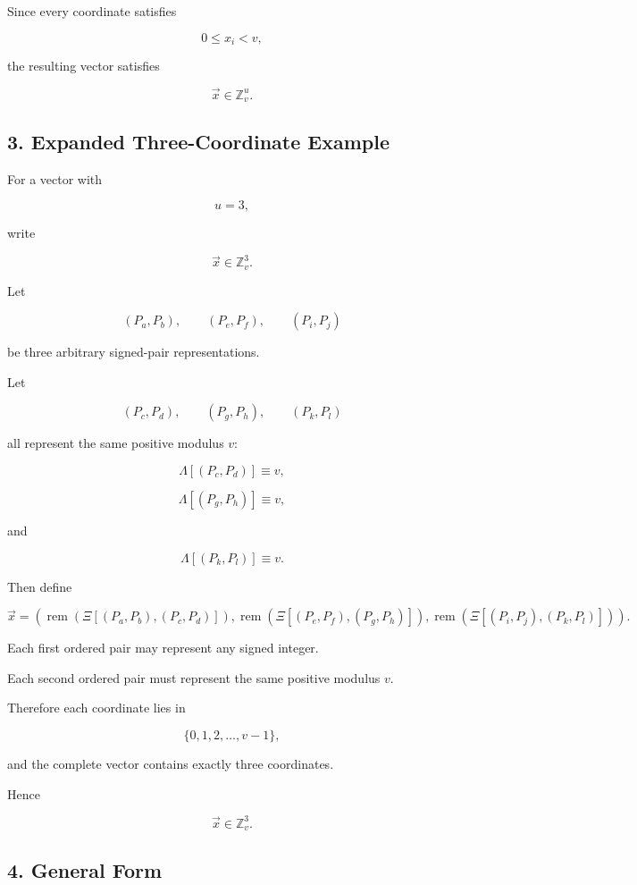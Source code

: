 \documentclass[12pt]{article}
\begin{document}
Since every coordinate satisfies

\[
0\leq x_i<v,
\]

the resulting vector satisfies

\[
\boxed{
\vec{x}\in\mathbb Z_v^u.
}
\]

\subsection*{3. Expanded Three-Coordinate Example}

For a vector with

\[
u=3,
\]

write

\[
\vec{x}\in\mathbb Z_v^3.
\]

Let

\[
(P_a,P_b),
\qquad
(P_e,P_f),
\qquad
(P_i,P_j)
\]

be three arbitrary signed-pair representations.

Let

\[
(P_c,P_d),
\qquad
(P_g,P_h),
\qquad
(P_k,P_l)
\]

all represent the same positive modulus \(v\):

\[
\Lambda[(P_c,P_d)]\equiv v,
\]

\[
\Lambda[(P_g,P_h)]\equiv v,
\]

and

\[
\Lambda[(P_k,P_l)]\equiv v.
\]

Then define

\[
\boxed{
\vec{x}
=
\left(
\operatorname{rem}
\left(
\Xi[(P_a,P_b),(P_c,P_d)]
\right),
\operatorname{rem}
\left(
\Xi[(P_e,P_f),(P_g,P_h)]
\right),
\operatorname{rem}
\left(
\Xi[(P_i,P_j),(P_k,P_l)]
\right)
\right).
}
\]

Each first ordered pair may represent any signed integer.

Each second ordered pair must represent the same positive modulus \(v\).

Therefore each coordinate lies in

\[
\{0,1,2,\ldots,v-1\},
\]

and the complete vector contains exactly three coordinates.

Hence

\[
\boxed{
\vec{x}\in\mathbb Z_v^3.
}
\]

\subsection*{4. General Form}
\end{document}
